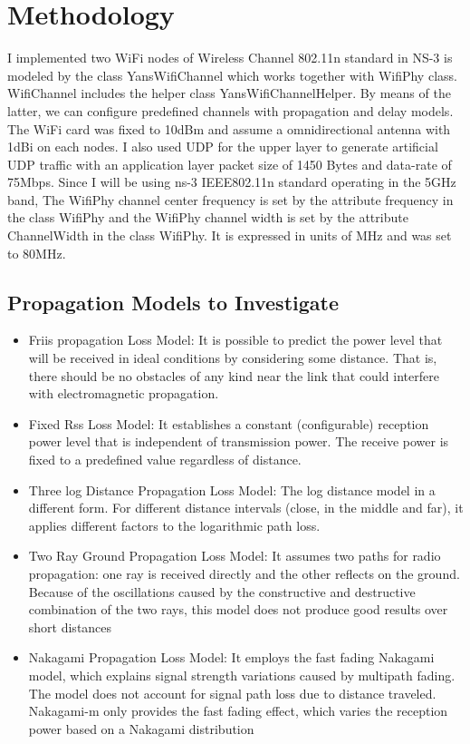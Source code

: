 \documentclass[conference]{IEEEtran}
\begin{document}
\section{Methodology}
I implemented two WiFi nodes of Wireless Channel 802.11n standard in NS-3 is modeled by the class YansWifiChannel which works together with WifiPhy class. WifiChannel includes the helper class YansWifiChannelHelper. By means of the latter, we can configure predefined channels with propagation and delay models. The WiFi card was fixed to 10dBm and assume a omnidirectional antenna with 1dBi on each nodes. I also used  UDP for the upper layer to generate artificial UDP traffic with an application layer packet size of 1450 Bytes and data-rate of 75Mbps. Since I will be using ns-3 IEEE802.11n standard operating in the 5GHz band, The WifiPhy channel center frequency is set by the attribute frequency in the class WifiPhy and the WifiPhy channel width is set by the attribute ChannelWidth in the class WifiPhy. It is expressed in units of MHz and was set to 80MHz.


\subsection{Propagation Models to Investigate}
\begin{itemize}
\item Friis propagation Loss Model: It is possible to predict the power level that will be received in ideal conditions by considering some distance. That is, there should be no obstacles of any kind near the link that could interfere with electromagnetic propagation.
\item Fixed Rss Loss Model: It establishes a constant (configurable) reception power level that is independent of transmission power. The receive power is fixed to a predefined value regardless of distance.
\item Three log Distance Propagation Loss Model: The log distance model in a different form. For different distance intervals (close, in the middle and far), it applies different factors to the logarithmic path loss.
\item Two Ray Ground Propagation Loss Model: It assumes two paths for radio propagation: one ray is received directly and the other reflects on the ground. Because of the oscillations caused by the constructive and destructive combination of the two rays, this model does not produce good results over short distances
\item Nakagami Propagation Loss Model: It employs the fast fading Nakagami model, which explains signal strength variations caused by multipath fading. The model does not account for signal path loss due to distance traveled. Nakagami-m only provides the fast fading effect, which varies the reception power based on a Nakagami distribution
\end{itemize}
\end{document}
